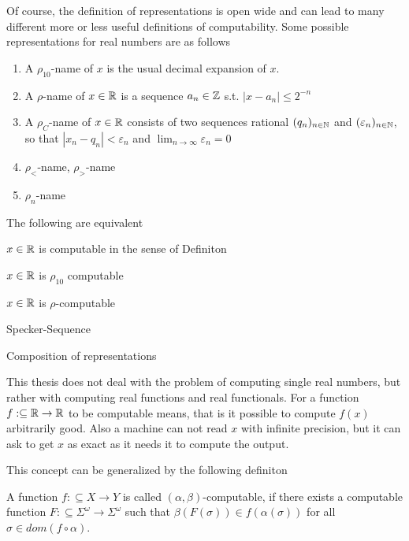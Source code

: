 Of course, the definition of representations is open wide and can lead to many different more or less useful definitions of computability.
Some possible representations for real numbers are as follows
\begin{enumerate}
\item A $\rho_{10}$-name of $x$ is the usual decimal expansion of $x$.
\item A $\rho$-name of $x \in \mathbb R$ is a sequence $a_n \in \mathbb Z$ s.t. $| x - a_n | \leq 2^{-n}$
\item  A $\rho_C$-name of $x \in \mathbb R$ consists of two sequences rational $(q_n)_{n \in \mathbb N}$ and $(\varepsilon_n)_{n \in \mathbb N}$, so that 
$| x_n - q_n | < \varepsilon_n$ and $\lim_{n \to \infty} \varepsilon_n = 0$  
\item $\rho_<$-name, $\rho_>$-name
\item $\rho_n$-name 
\end{enumerate}
\begin{theorem}
The following are equivalent
\item $x \in \mathbb R$ is computable in the sense of Definiton 
\item $x \in \mathbb R$ is $\rho_{10}$ computable
\item $x \in \mathbb R$ is $\rho$-computable
\end{theorem}
\begin{example}
Specker-Sequence
\begin{definition}\label{def:representation_composition}
Composition of representations
\end{definition}
\end{example}
This thesis does not deal with the problem of computing single real numbers, but rather with computing real functions and real functionals.
For a function $f:\subseteq \mathbb R \to \mathbb R$ to be computable means, that is it possible to compute $f(x)$ arbitrarily good. 
Also a machine can not read $x$ with infinite precision, but it can ask to get $x$ as exact as it needs it to compute the output.
\begin{definition}\label{def:computability_oracle_tm}
\end{definition}
This concept can be generalized by the following definiton  
\begin{definition}\label{def:computability_function_representation}
	A function $f: \subseteq X \to Y$ is called \textbf{$(\alpha, \beta)$}-computable, 
	if there exists a computable function $F:\subseteq \Sigma^\omega \to \Sigma^\omega$ such that 
	$\beta(F(\sigma)) \in f(\alpha(\sigma))$ for all $\sigma \in dom(f \circ \alpha) $.  
\end{definition}
